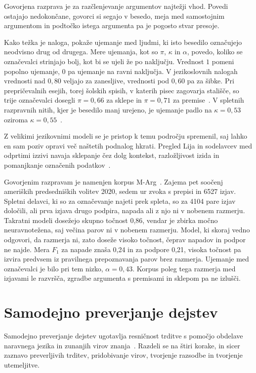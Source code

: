 \documentclass[a4paper, 12pt]{book}
\begin{document}
Govorjena razprava je za razčlenjevanje argumentov najtežji vhod. Povedi ostajajo nedokončane, govorci si segajo v besedo, meja med samostojnim argumentom in podtočko istega argumenta pa je pogosto stvar presoje. 

Kako težka je naloga, pokaže ujemanje med ljudmi, ki isto besedilo označujejo neodvisno drug od drugega. Mere ujemanja, kot so $\pi$, $\kappa$ in $\alpha$, povedo, koliko se označevalci strinjajo bolj, kot bi se ujeli že po naključju. Vrednost $1$ pomeni popolno ujemanje, $0$ pa ujemanje na ravni naključja. V jezikoslovnih nalogah vrednosti nad $0{,}80$ veljajo za zanesljive, vrednosti pod $0{,}60$ pa za šibke. Pri prepričevalnih esejih, torej šolskih spisih, v katerih pisec zagovarja stališče, so trije označevalci dosegli $\pi = 0{,}66$ za sklepe in $\pi = 0{,}71$ za premise~\cite{stab2014}. V spletnih razpravnih nitih, kjer je besedilo manj urejeno, je ujemanje padlo na $\kappa = 0{,}53$ oziroma $\kappa = 0{,}55$~\cite{collagree2018}.

Z velikimi jezikovnimi modeli se je pristop k temu področju spremenil, saj lahko en sam poziv opravi več naštetih podnalog hkrati. Pregled Lija in sodelavcev med odprtimi izzivi navaja sklepanje čez dolg kontekst, razložljivost izida in pomanjkanje označenih podatkov~\cite{li2025llmargmining}.

Govorjenim razpravam je namenjen korpus M-Arg~\cite{mestre2021marg}. Zajema pet soočenj ameriških predsedniških volitev 2020, sedem ur zvoka s prepisi in 6527 izjav. Spletni delavci, ki so za označevanje najeti prek spleta, so za 4104 pare izjav določili, ali prva izjava drugo podpira, napada ali z njo ni v nobenem razmerju. Takratni modeli dosežejo skupno točnost 0,86, vendar je zbirka močno neuravnotežena, saj večina parov ni v nobenem razmerju. Model, ki skoraj vedno odgovori, da razmerja ni, zato doseže visoko točnost, čeprav napadov in podpor ne najde. Mera $F_1$ za napade znaša 0,24 in za podpore 0,21, visoka točnost pa izvira predvsem iz pravilnega prepoznavanja parov brez razmerja. Ujemanje med označevalci je bilo pri tem nizko, $\alpha = 0{,}43$. Korpus poleg tega razmerja med izjavami le razvršča, zgradbe argumenta s premisami in sklepom pa ne izlušči. 

\section{Samodejno preverjanje dejstev}
\label{sec:fact-checking-sorodna}
Samodejno preverjanje dejstev ugotavlja resničnost trditve s pomočjo obdelave naravnega jezika in zunanjih virov znanja~\cite{guo2022survey}. Razdeli se na
štiri korake, in sicer zaznavo preverljivih trditev, pridobivanje virov, tvorjenje razsodbe in tvorjenje utemeljitve.
\end{document}
